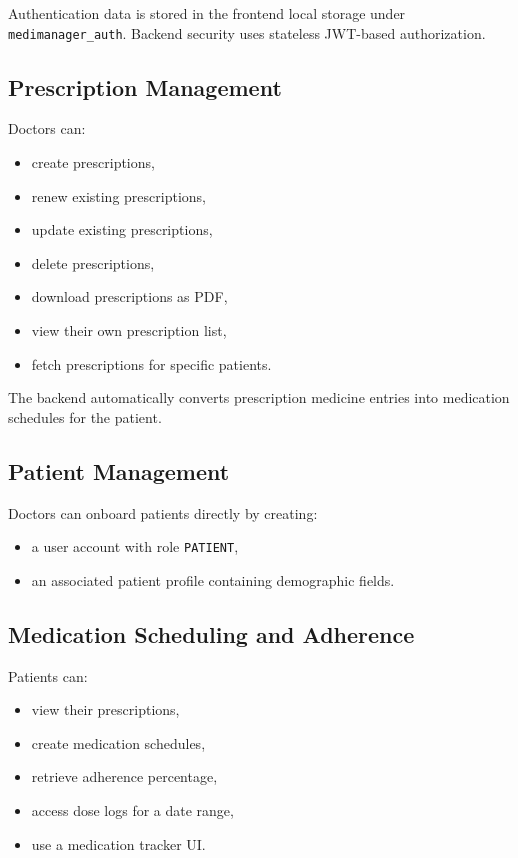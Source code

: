 \documentclass[12pt,a4paper]{article}
\begin{document}
Authentication data is stored in the frontend local storage under \texttt{medimanager\_auth}. Backend security uses stateless JWT-based authorization.

\subsection{Prescription Management}
Doctors can:
\begin{itemize}[leftmargin=*]
  \item create prescriptions,
  \item renew existing prescriptions,
  \item update existing prescriptions,
  \item delete prescriptions,
  \item download prescriptions as PDF,
  \item view their own prescription list,
  \item fetch prescriptions for specific patients.
\end{itemize}

The backend automatically converts prescription medicine entries into medication schedules for the patient.

\subsection{Patient Management}
Doctors can onboard patients directly by creating:
\begin{itemize}[leftmargin=*]
  \item a user account with role \texttt{PATIENT},
  \item an associated patient profile containing demographic fields.
\end{itemize}

\subsection{Medication Scheduling and Adherence}
Patients can:
\begin{itemize}[leftmargin=*]
  \item view their prescriptions,
  \item create medication schedules,
  \item retrieve adherence percentage,
  \item access dose logs for a date range,
  \item use a medication tracker UI.
\end{itemize}
\end{document}
